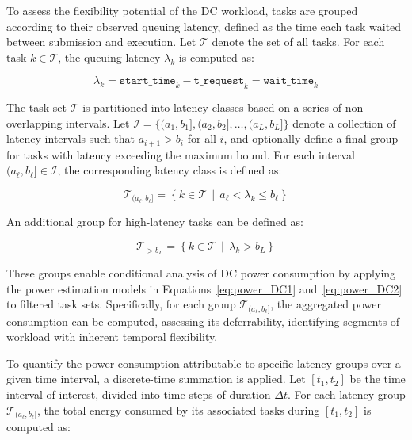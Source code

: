 \documentclass[preprint,12pt]{elsarticle}
\begin{document}
To assess the flexibility potential of the DC workload, tasks are grouped according to their observed queuing latency, defined as the time each task waited between submission and execution. Let $\mathcal{T}$ denote the set of all tasks. For each task $k \in \mathcal{T}$, the queuing latency $\lambda_k$ is computed as:

\begin{equation}
\lambda_k = \texttt{start\_time}_k - \texttt{t\_request}_k = \texttt{wait\_time}_k
\end{equation}

The task set $\mathcal{T}$ is partitioned into latency classes based on a series of non-overlapping intervals. Let $\mathcal{I} = \{ (a_1, b_1], (a_2, b_2], \dots, (a_L, b_L] \}$ denote a collection of latency intervals such that $a_{i+1} > b_i$ for all $i$, and optionally define a final group for tasks with latency exceeding the maximum bound. For each interval $(a_\ell, b_\ell] \in \mathcal{I}$, the corresponding latency class is defined as:

\begin{equation}
\mathcal{T}_{(a_\ell, b_\ell]} = \left\{ k \in \mathcal{T} \,\middle|\, a_\ell < \lambda_k \leq b_\ell \right\}
\end{equation}

An additional group for high-latency tasks can be defined as:

\begin{equation}
\mathcal{T}_{>b_L} = \left\{ k \in \mathcal{T} \,\middle|\, \lambda_k > b_L \right\}
\end{equation}

These groups enable conditional analysis of DC power consumption by applying the power estimation models in Equations~\ref{eq:power_DC1} and~\ref{eq:power_DC2} to filtered task sets. Specifically, for each group $\mathcal{T}_{(a_\ell, b_\ell]}$, the aggregated power consumption can be computed, assessing its deferrability, identifying segments of workload with inherent temporal flexibility.

To quantify the power consumption attributable to specific latency groups over a given time interval, a discrete-time summation is applied. Let $[t_1, t_2]$ be the time interval of interest, divided into time steps of duration $\Delta t$. For each latency group $\mathcal{T}_{(a_\ell, b_\ell]}$, the total energy consumed by its associated tasks during $[t_1, t_2]$ is computed as:
\end{document}
